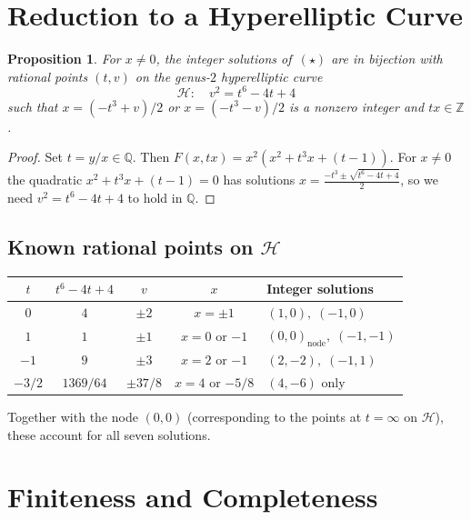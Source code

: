 \documentclass[12pt, a4paper]{article}
\newtheorem{proposition}[theorem]{Proposition}
\theoremstyle{definition}
\newcommand{\Z}{\mathbb{Z}}
\newcommand{\Q}{\mathbb{Q}}
\begin{document}
\section{Reduction to a Hyperelliptic Curve}

\begin{proposition}\label{prop:hyp}
  For $x \neq 0$, the integer solutions of~$(\star)$ are in bijection with rational points
  $(t, v)$ on the genus-$2$ hyperelliptic curve
  \[
    \mathcal{H}: \quad v^2 = t^6 - 4t + 4 \tag{$H$}
  \]
  such that $x = (-t^3 + v)/2$ or $x = (-t^3 - v)/2$ is a nonzero integer and $tx \in \Z$.
\end{proposition}
\begin{proof}
  Set $t = y/x \in \Q$.  Then $F(x,tx) = x^2(x^2 + t^3 x + (t-1))$.  For $x \neq 0$ the
  quadratic $x^2 + t^3 x + (t-1) = 0$ has solutions $x = \frac{-t^3 \pm \sqrt{t^6 - 4t + 4}}{2}$,
  so we need $v^2 = t^6 - 4t + 4$ to hold in $\Q$.
\end{proof}

\subsection{Known rational points on $\mathcal{H}$}

\begin{center}
\renewcommand{\arraystretch}{1.2}
\begin{tabular}{c c c c l}
\toprule
$t$ & $t^6-4t+4$ & $v$ & $x$ & Integer solutions \\
\midrule
$0$ & $4$ & $\pm2$ & $x=\pm1$ & $(1,0),\;(-1,0)$ \\
$1$ & $1$ & $\pm1$ & $x=0$ or $-1$ & $(0,0)_\text{node},\;(-1,-1)$ \\
$-1$ & $9$ & $\pm3$ & $x=2$ or $-1$ & $(2,-2),\;(-1,1)$ \\
$-3/2$ & $1369/64$ & $\pm37/8$ & $x=4$ or $-5/8$ & $(4,-6)$ only \\
\bottomrule
\end{tabular}
\end{center}

\noindent
Together with the node $(0,0)$ (corresponding to the points at $t = \infty$ on $\mathcal{H}$),
these account for all seven solutions.

\section{Finiteness and Completeness}
\end{document}
